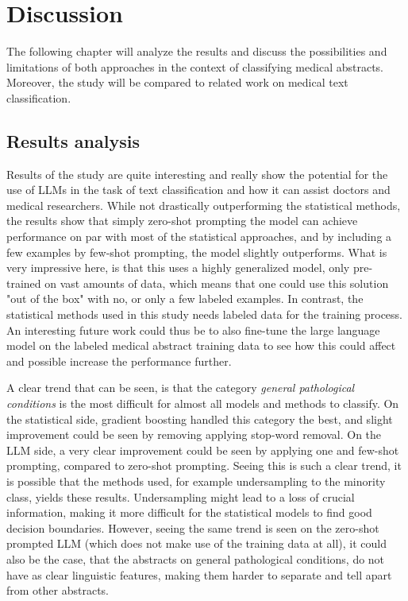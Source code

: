 \section{Discussion}
\label{sec:discussion}


The following chapter will analyze the results and discuss the possibilities and limitations of both approaches in the context of classifying medical abstracts. Moreover, the study will be compared to related work on medical text classification.

\subsection{Results analysis}
\label{subsec:res-analysis}

Results of the study are quite interesting and really show the potential for the use of LLMs in the task of text classification and how it can assist doctors and medical researchers. While not drastically outperforming the statistical methods, the results show that simply zero-shot prompting the model can achieve performance on par with most of the statistical approaches, and by including a few examples by few-shot prompting, the model slightly outperforms. What is very impressive here, is that this uses a highly generalized model, only pre-trained on vast amounts of data, which means that one could use this solution "out of the box" with no, or only a few labeled examples. In contrast, the statistical methods used in this study needs labeled data for the training process. An interesting future work could thus be to also fine-tune the large language model on the labeled medical abstract training data to see how this could affect and possible increase the performance further. 

A clear trend that can be seen, is that the category \textit{general pathological conditions} is the most difficult for almost all models and methods to classify. On the statistical side, gradient boosting handled this category the best, and slight improvement could be seen by removing applying stop-word removal. On the LLM side, a very clear improvement could be seen by applying one and few-shot prompting, compared to zero-shot prompting. Seeing this is such a clear trend, it is possible that the methods used, for example undersampling to the minority class, yields these results. Undersampling might lead to a loss of crucial information, making it more difficult for the statistical models to find good decision boundaries. However, seeing the same trend is seen on the zero-shot prompted LLM (which does not make use of the training data at all), it could also be the case, that the abstracts on general pathological conditions, do not have as clear linguistic features, making them harder to separate and tell apart from other abstracts.

